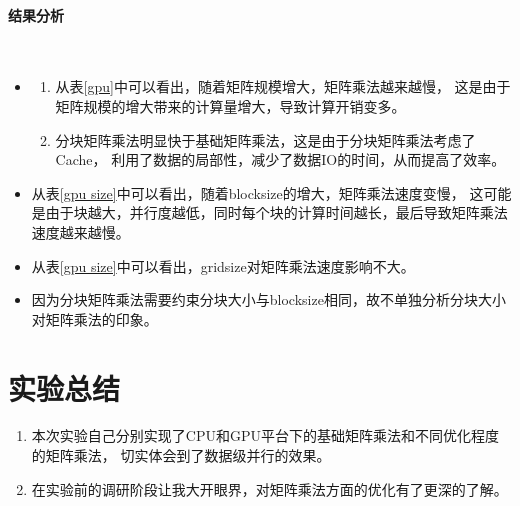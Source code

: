 \documentclass[UTF8]{article}
\begin{document}
    \paragraph{结果分析}\mbox{}\\
    \begin{itemize}
        \item \begin{enumerate}
            \item 从表\ref{gpu}中可以看出，随着矩阵规模增大，矩阵乘法越来越慢，
            这是由于矩阵规模的增大带来的计算量增大，导致计算开销变多。
            \item 分块矩阵乘法明显快于基础矩阵乘法，这是由于分块矩阵乘法考虑了Cache，
            利用了数据的局部性，减少了数据IO的时间，从而提高了效率。
        \end{enumerate}
        \item 从表\ref{gpu size}中可以看出，随着blocksize的增大，矩阵乘法速度变慢，
        这可能是由于块越大，并行度越低，同时每个块的计算时间越长，最后导致矩阵乘法速度越来越慢。
        \item 从表\ref{gpu size}中可以看出，gridsize对矩阵乘法速度影响不大。
        \item 因为分块矩阵乘法需要约束分块大小与blocksize相同，故不单独分析分块大小对矩阵乘法的印象。
    \end{itemize}
    \section{实验总结}
    \begin{enumerate}
        \item 本次实验自己分别实现了CPU和GPU平台下的基础矩阵乘法和不同优化程度的矩阵乘法，
        切实体会到了数据级并行的效果。
        \item 在实验前的调研阶段让我大开眼界，对矩阵乘法方面的优化有了更深的了解。
    \end{enumerate}
\end{document}
